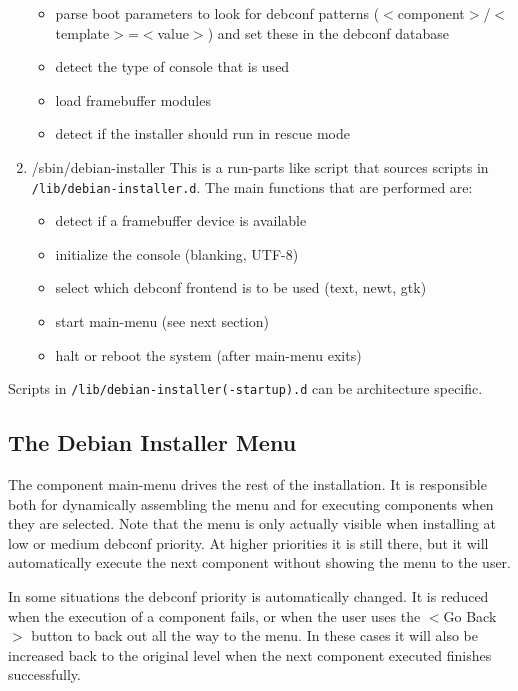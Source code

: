 \documentclass[a4paper,10pt]{article}
\begin{document}
\begin{enumerate}
\begin{itemize}
\item parse boot parameters to look for debconf patterns ($<$component$>$/$<$template$>$=$<$value$>$) and set these in the debconf database
\item detect the type of console that is used
\item load framebuffer modules
\item detect if the installer should run in rescue mode
  \end{itemize}
\item
  \begin{flushleft}
/sbin/debian-installer \linebreak
This is a run-parts like script that sources scripts in \texttt{/lib/debian-installer.d}. The main functions that are performed are:
  \end{flushleft}
  \begin{itemize}
\item detect if a framebuffer device is available
\item initialize the console (blanking, UTF-8)
\item select which debconf frontend is to be used (text, newt, gtk)
\item start main-menu (see next section)
\item halt or reboot the system (after main-menu exits)
  \end{itemize}
\end{enumerate}

Scripts in \texttt{/lib/debian-installer(-startup).d} can be architecture specific. 


\subsection{The Debian Installer Menu}
The component main-menu drives the rest of the installation. It is responsible both for dynamically assembling the menu and for executing components when they are selected. Note that the menu is only actually visible when installing at low or medium debconf priority. At higher priorities it is still there, but it will automatically execute the next component without showing the menu to the user. 

In some situations the debconf priority is automatically changed. It is reduced when the execution of a component fails, or when the user uses the $<$Go Back$>$ button to back out all the way to the menu. In these cases it will also be increased back to the original level when the next component executed finishes successfully. 
\end{document}
